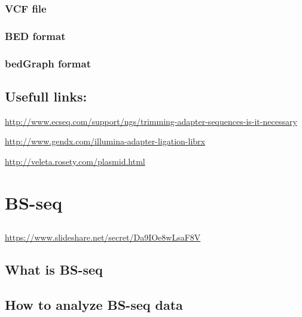 \documentclass[]{book}
\begin{document}
\hypertarget{vcf-file}{%
\subsection{VCF file}\label{vcf-file}}

\hypertarget{bed-format}{%
\subsection{BED format}\label{bed-format}}

\hypertarget{bedgraph-format}{%
\subsection{bedGraph format}\label{bedgraph-format}}

\hypertarget{usefull-links}{%
\section{Usefull links:}\label{usefull-links}}

\url{http://www.ecseq.com/support/ngs/trimming-adapter-sequences-is-it-necessary}

\url{http://www.gendx.com/illumina-adapter-ligation-librx}

\url{http://veleta.rosety.com/plasmid.html}

\hypertarget{bs-seq}{%
\chapter{BS-seq}\label{bs-seq}}

\hypertarget{section-2}{%
\section{}\label{section-2}}

\url{https://www.slideshare.net/secret/Da9IOe8wLsaF8V}

\hypertarget{what-is-bs-seq}{%
\section{What is BS-seq}\label{what-is-bs-seq}}

\hypertarget{section-3}{%
\section{}\label{section-3}}

\hypertarget{how-to-analyze-bs-seq-data}{%
\section{How to analyze BS-seq data}\label{how-to-analyze-bs-seq-data}}
\end{document}
